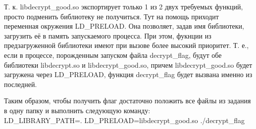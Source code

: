 Т. к. libdecrypt\_good.so экспортирует только 1 из 2 двух требуемых функций, просто подменить библиотеку не получиться. Тут на помощь приходит переменная окружения LD\_PRELOAD. Она позволяет, задав имя библиотеки, загрузить её в память запускаемого процесса. При этом, фукнции из предзагруженной библиотеки имеют при вызове более высокий приоритет. Т. е., если в процессе, порожденным запуском файла decrypt\_flag, будут обе библиотеки libdecrypt.so и libdecrypt\_good.so, причем libdecrypt\_good.so будет загружена через LD\_PRELOAD, функция decrypt\_flag будет вызвана именно из последней.

Таким образом, чтобы получить флаг достаточно положить все файлы из задания в одну папку и выполнить следующую команду:\\
LD\_LIBRARY\_PATH=. LD\_PRELOAD=libdecrypt\_good.so ./decrypt\_flag

